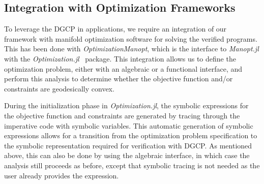 \documentclass[twoside,11pt]{article}
\begin{document}
\subsection{Integration with Optimization Frameworks}

To leverage the DGCP in applications, we require an integration of our framework with manifold optimization software for solving the verified programs. This has been done with \textsl{OptimizationManopt}, which is the interface to \textsl{Manopt.jl} with the \textsl{Optimization.jl}~\citep{vaibhav_kumar_dixit_2023_7738525} package. This integration allows us to define the optimization problem, either with an algebraic or a functional interface, and perform this analysis to determine whether the objective function and/or constraints are geodesically convex.

During the initialization phase in \textsl{Optimization.jl}, the symbolic expressions for the objective function and constraints are generated by tracing through the imperative code with symbolic variables. This automatic generation of symbolic expressions allows for a transition from the optimization problem specification to the symbolic representation required for verification with DGCP. As mentioned above, this can also be done by using the algebraic interface, in which case the analysis still proceeds as before, except that symbolic tracing is not needed as the user already provides the expression.
\end{document}
